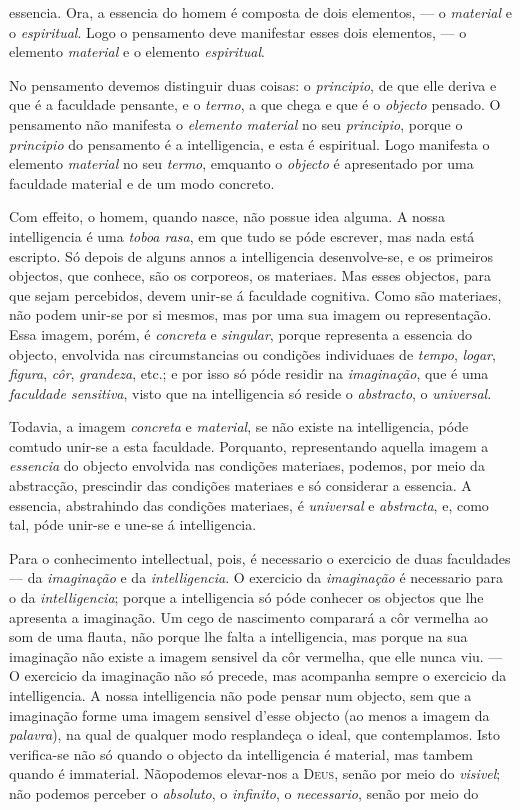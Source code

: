 essencia. Ora, a essencia do homem é composta de dois elementos, --- o \emph{material} e o \emph{espiritual}. Logo o pensamento deve manifestar esses dois elementos, --- o elemento \emph{material} e o elemento \emph{espiritual}.\par No pensamento devemos distinguir duas coisas: o \emph{principio}, de que elle deriva e que é a faculdade pensante, e o \emph{termo}, a que chega e que é o \emph{objecto} pensado. O pensamento não manifesta o \emph{elemento material} no seu \emph{principio}, porque o \emph{principio} do pensamento é a intelligencia, e esta é espiritual. Logo manifesta o elemento \emph{material} no seu \emph{termo}, emquanto o \emph{objecto} é apresentado por uma faculdade material e de um modo concreto.\par Com effeito, o homem, quando nasce, não possue idea alguma. A nossa intelligencia é uma \emph{toboa rasa}, em que tudo se póde escrever, mas nada está escripto. Só depois de alguns annos a intelligencia desenvolve-se, e os primeiros objectos, que conhece, são os corporeos, os materiaes. Mas esses objectos, para que sejam percebidos, devem unir-se á faculdade cognitiva. Como são materiaes, não podem unir-se por si mesmos, mas por uma sua imagem ou representação. Essa imagem, porém, é \emph{concreta} e \emph{singular}, porque representa a essencia do objecto, envolvida nas circumstancias ou condições individuaes de \emph{tempo}, \emph{logar}, \emph{figura}, \emph{côr}, \emph{grandeza}, etc.; e por isso só póde residir na \emph{imaginação}, que é uma \emph{faculdade sensitiva}, visto que na intelligencia só reside o \emph{abstracto}, o \emph{universal}.\par Todavia, a imagem \emph{concreta} e \emph{material}, se não existe na intelligencia, póde comtudo unir-se a esta faculdade. Porquanto, representando aquella imagem a \emph{essencia} do objecto envolvida nas condições materiaes, podemos, por meio da abstracção, prescindir das condições materiaes e só considerar a essencia. A essencia, abstrahindo das condições materiaes, é \emph{universal} e \emph{abstracta}, e, como tal, póde unir-se e une-se á intelligencia.\par Para o conhecimento intellectual, pois, é necessario o exercicio de duas faculdades --- da \emph{imaginação} e da \emph{intelligencia}. O exercicio da \emph{imaginação} é necessario para o da \emph{intelligencia}; porque a intelligencia só póde conhecer os objectos que lhe apresenta a imaginação. Um cego de nascimento comparará a côr vermelha ao som de uma flauta, não porque lhe falta a intelligencia, mas porque na sua imaginação não existe a imagem sensivel da côr vermelha, que elle nunca viu. --- O exercicio da imaginação não só precede, mas acompanha sempre o exercicio da intelligencia. A nossa intelligencia não pode pensar num objecto, sem que a imaginação forme uma imagem sensivel d'esse objecto (ao menos a imagem da \emph{palavra}), na qual de qualquer modo resplandeça o ideal, que contemplamos. Isto verifica-se não só quando o objecto da intelligencia é material, mas tambem quando é immaterial. Nãopodemos elevar-nos a \textsc{Deus}, senão por meio do \emph{visivel}; não podemos perceber o \emph{absoluto}, o \emph{infinito}, o \emph{necessario}, senão por meio do 